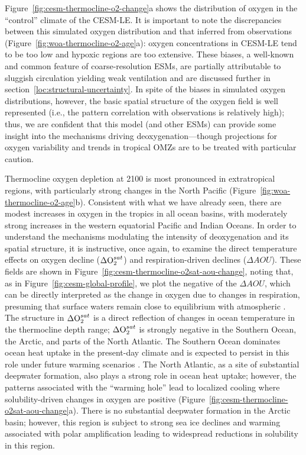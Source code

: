 \documentclass[draft,linenumbers]{report_chapter}
\begin{document}
Figure~\ref{fig:cesm-thermocline-o2-change}a shows the distribution of oxygen in the ``control'' climate of the CESM-LE.
It is important to note the discrepancies between this simulated oxygen distribution and that inferred from observations (Figure~\ref{fig:woa-thermocline-o2-age}a): oxygen concentrations in CESM-LE tend to be too low and hypoxic regions are too extensive.
These biases, a well-known and common feature of coarse-resolution ESMs, are partially attributable to sluggish circulation yielding weak ventilation and are discussed further in section~\ref{loc:structural-uncertainty}.
In spite of the biases in simulated oxygen distributions, however, the basic spatial structure of the oxygen field is well represented (i.e., the pattern correlation with observations is relatively high); thus, we are confident that this model (and other ESMs) can provide some insight into the mechanisms driving deoxygenation---though projections for oxygen variability and trends in tropical OMZs are to be treated with particular caution.

Thermocline oxygen depletion at 2100 is most pronounced in extratropical regions, with particularly strong changes in the North Pacific (Figure~\ref{fig:woa-thermocline-o2-age}b).
Consistent with what we have already seen, there are modest increases in oxygen in the tropics in all ocean basins, with moderately strong increases in the western equatorial Pacific and Indian Oceans.
In order to understand the mechanisms modulating the intensity of deoxygenation and its spatial structure, it is instructive, once again, to examine the direct temperature effects on oxygen decline ($\Delta\ce{O2}^{sat}$) and respiration-driven declines ($\Delta{}AOU$).
These fields are shown in Figure~\ref{fig:cesm-thermocline-o2sat-aou-change}, noting that, as in Figure~\ref{fig:cesm-global-profile}, we plot the negative of the $\Delta{}AOU$, which can be directly interpreted as the change in oxygen due to changes in respiration, presuming that surface waters remain close to  equilibrium with atmospheric .
The structure in $\Delta\ce{O2}^{sat}$ is a direct reflection of changes in ocean temperature in the thermocline depth range; $\Delta\ce{O2}^{sat}$ is strongly negative in the Southern Ocean, the Arctic, and parts of the North Atlantic.
The Southern Ocean dominates ocean heat uptake in the present-day climate \citep{Talley-Feely-etal-2015} and is expected to persist in this role under future warming scenarios \citep{Frolicher-Sarmiento-etal-2015}.
The North Atlantic, as a site of substantial deepwater formation, also plays a strong role in ocean heat uptake; however, the patterns associated with the ``warming hole'' lead to localized cooling where solubility-driven changes in oxygen are positive (Figure~\ref{fig:cesm-thermocline-o2sat-aou-change}a).
There is no substantial deepwater formation in the Arctic basin; however, this region is subject to strong sea ice declines and warming associated with polar amplification \citep{Screen-Simmonds-2010} leading to widespread reductions in solubility in this region.
\end{document}
